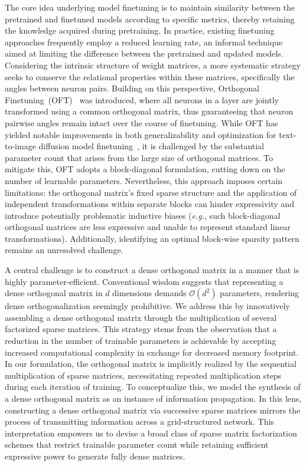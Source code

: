 The core idea underlying model finetuning is to maintain similarity between the pretrained and finetuned models according to specific metrics, thereby retaining the knowledge acquired during pretraining. In practice, existing finetuning approaches frequently employ a reduced learning rate, an informal technique aimed at limiting the difference between the pretrained and updated models. Considering the intrinsic structure of weight matrices, a more systematic strategy seeks to conserve the relational properties within these matrices, specifically the angles between neuron pairs. Building on this perspective, Orthogonal Finetuning~(OFT)~\cite{qiu2023controlling} was introduced, where all neurons in a layer are jointly transformed using a common orthogonal matrix, thus guaranteeing that neuron pairwise angles remain intact over the course of finetuning. While OFT has yielded notable improvements in both generalizability and optimization for text-to-image diffusion model finetuning~\cite{qiu2023controlling}, it is challenged by the substantial parameter count that arises from the large size of orthogonal matrices. To mitigate this, OFT adopts a block-diagonal formulation, cutting down on the number of learnable parameters. Nevertheless, this approach imposes certain limitations: the orthogonal matrix’s fixed sparse structure and the application of independent transformations within separate blocks can hinder expressivity and introduce potentially problematic inductive biases (\emph{e.g.}, such block-diagonal orthogonal matrices are less expressive and unable to represent standard linear transformations). Additionally, identifying an optimal block-wise sparsity pattern remains an unresolved challenge.

A central challenge is to construct a dense orthogonal matrix in a manner that is highly parameter-efficient. Conventional wisdom suggests that representing a dense orthogonal matrix in $d$ dimensions demands $\mathcal{O}(d^2)$ parameters, rendering dense orthogonalization seemingly prohibitive. We address this by innovatively assembling a dense orthogonal matrix through the multiplication of several factorized sparse matrices. This strategy stems from the observation that a reduction in the number of trainable parameters is achievable by accepting increased computational complexity in exchange for decreased memory footprint. In our formulation, the orthogonal matrix is implicitly realized by the sequential multiplication of sparse matrices, necessitating repeated multiplication steps during each iteration of training. To conceptualize this, we model the synthesis of a dense orthogonal matrix as an instance of information propagation. In this lens, constructing a dense orthogonal matrix via successive sparse matrices mirrors the process of transmitting information across a grid-structured network. This interpretation empowers us to devise a broad class of sparse matrix factorization schemes that restrict trainable parameter count while retaining sufficient expressive power to generate fully dense matrices.

